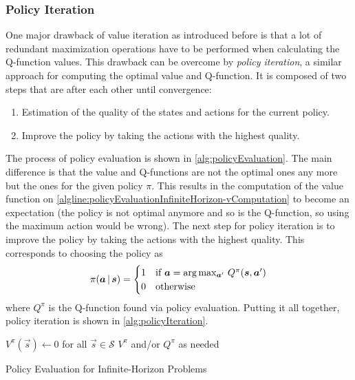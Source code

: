 			\subsubsection{Policy Iteration}
				One major drawback of value iteration as introduced before is that a lot of redundant maximization operations have to be performed when calculating the Q-function values. This drawback can be overcome by \emph{policy iteration}, a similar approach for computing the optimal value and Q-function. It is composed of two steps that are after each other until convergence:
				\begin{enumerate}
					\item {} Estimation of the quality of the states and actions for the current policy.
					\item {} Improve the policy by taking the actions with the highest quality.
				\end{enumerate}
				The process of policy evaluation is shown in \autoref{alg:policyEvaluation}. The main difference is that the value and Q-functions are not the optimal ones any more but the ones for the given policy \(\pi\). This results in the computation of the value function on \autoref{algline:policyEvaluationInfiniteHorizon-vComputation} to become an expectation (the policy is not optimal anymore and so is the Q-function, so using the maximum action would be wrong). The next step for policy iteration is to improve the policy by taking the actions with the highest quality. This corresponds to choosing the policy as
				\begin{equation*}
					\pi(\bm{a} \,\vert\, \bm{s}) =
					\begin{cases}
						1 & \text{if } \bm{a} = \arg\max_{\bm{a}'} \, Q^\pi(\bm{s}, \bm{a}') \\
						0 & \text{otherwise}
					\end{cases}
				\end{equation*}
				where \( Q^\pi \) is the Q-function found via policy evaluation. Putting it all together, policy iteration is shown in \autoref{alg:policyIteration}.

				\begin{algorithm}  \DontPrintSemicolon
					\( V^\pi(\vec{s}) \gets 0 \) for all \( \vec{s} \in \mathcal{S} \) \;
					\Return \( V^\pi \) and/or \( Q^\pi \) as needed \;

					\caption{Policy Evaluation for Infinite-Horizon Problems}
					\label{alg:policyEvaluation}
				\end{algorithm}

